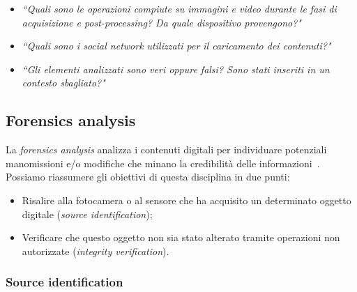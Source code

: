 \begin{itemize}
    \item \textit{“Quali sono le operazioni compiute su immagini e video durante le fasi di acquisizione e post-processing? Da quale dispositivo provengono?"}
    \item \textit{“Quali sono i social network utilizzati per il caricamento dei contenuti?"}
    \item \textit{“Gli elementi analizzati sono veri oppure falsi? Sono stati inseriti in un contesto sbagliato?"}
\end{itemize}

\subsection{Forensics analysis}
\label{sub_sec:forensics_analysis}

La \textit{forensics analysis} analizza i contenuti digitali per individuare potenziali manomissioni e/o modifiche che minano la credibilità delle informazioni~\cite{bartolucci}. Possiamo riassumere gli obiettivi di questa disciplina in due punti:

\begin{itemize}
    \item Risalire alla fotocamera o al sensore che ha acquisito un determinato oggetto digitale (\textit{source identification});
    \item Verificare che questo oggetto non sia stato alterato tramite operazioni non autorizzate (\textit{integrity verification}).
\end{itemize}

\subsubsection{Source identification}
\label{sub_sub_sec:source_identification}

